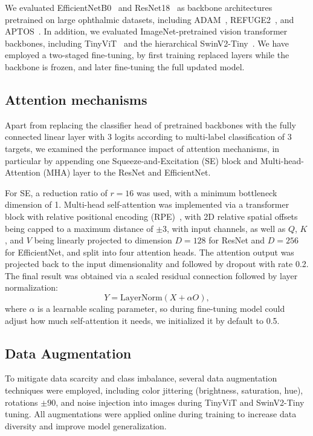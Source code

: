 \documentclass{article}
\begin{document}
We evaluated EfficientNetB0~\cite{Tan2019EfficientNet} and ResNet18~\cite{He2016ResNet} as backbone architectures pretrained on large ophthalmic datasets, including ADAM~\cite{Fang2022ADAM}, REFUGE2~\cite{Fang2022REFUGE2}, and APTOS~\cite{APTOS2019}. In addition, we evaluated ImageNet-pretrained vision transformer backbones, including TinyViT~\cite{Wu2022TinyViTArXiv} and the hierarchical SwinV2-Tiny~\cite{Liu2022SwinV2}. We have employed a two-staged fine-tuning, by first training replaced layers while the backbone is frozen, and later fine-tuning the full updated model.

\subsection{Attention mechanisms}

Apart from replacing the classifier head of pretrained backbones with the fully connected linear layer with 3 logits according to multi-label classification of 3 targets, we examined the performance impact of attention mechanisms, in particular by appending one Squeeze-and-Excitation (SE) \cite{Hu2018SENet} block and Multi-head-Attention (MHA) \cite{Vaswani2017Attention} layer to the ResNet and EfficientNet.

For SE, a reduction ratio of $r=16$ was used, with a minimum bottleneck dimension of 1. Multi-head self-attention was implemented via a transformer block with relative positional encoding (RPE)~\cite{Shaw2018RelativeAttention}, with 2D relative spatial offsets being capped to a maximum distance of $\pm3$, with input channels, as well as  $Q$, $K$, and $V$ being linearly projected to dimension $D=128$ for ResNet and $D=256$ for EfficientNet, and split into four attention heads. The attention output was projected back to the input dimensionality and followed by dropout with rate 0.2. The final result was obtained via a scaled residual connection followed by layer normalization:
\begin{equation}
Y = \mathrm{LayerNorm}(X + \alpha O),
\end{equation}
where $\alpha$ is a learnable scaling parameter, so during fine-tuning model could adjust how much self-attention it needs, we initialized it by default to 0.5.

\subsection{Data Augmentation}

To mitigate data scarcity and class imbalance, several data augmentation techniques were employed, including color jittering (brightness, saturation, hue), rotations $\pm90$, and noise injection into images during TinyViT and SwinV2-Tiny tuning. All augmentations were applied online during training to increase data diversity and improve model generalization.
\end{document}
